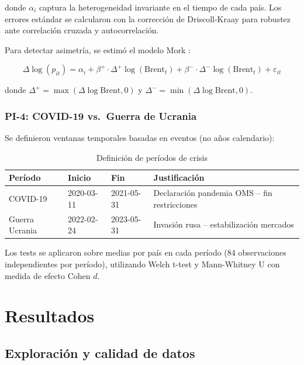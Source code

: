 \documentclass[stu, 12pt, a4paper, biblatex, donotrepeattitle]{apa7}
\begin{document}
donde $\alpha_i$ captura la heterogeneidad invariante en el tiempo de cada país. Los errores estándar se calcularon con la corrección de Driscoll-Kraay \parencite{driscollkraay1998} para robustez ante correlación cruzada y autocorrelación.

Para detectar asimetría, se estimó el modelo Mork \parencite{mork1989}:

\begin{equation}
\Delta\log(p_{it}) = \alpha_i + \beta^+ \cdot \Delta^+\log(\text{Brent}_t) + \beta^- \cdot \Delta^-\log(\text{Brent}_t) + \varepsilon_{it}
\end{equation}

donde $\Delta^+ = \max(\Delta\log\text{Brent}, 0)$ y $\Delta^- = \min(\Delta\log\text{Brent}, 0)$.

\subsubsection{PI-4: COVID-19 vs.\ Guerra de Ucrania}

Se definieron ventanas temporales basadas en eventos (no años calendario):

\begin{table}[H]
\centering
\caption{Definición de períodos de crisis}
\label{tab:periodos}
\begin{tabular}{llll}
\toprule
\textbf{Período} & \textbf{Inicio} & \textbf{Fin} & \textbf{Justificación} \\
\midrule
COVID-19 & 2020-03-11 & 2021-05-31 & Declaración pandemia OMS -- fin restricciones \\
Guerra Ucrania & 2022-02-24 & 2023-05-31 & Invasión rusa -- estabilización mercados \\
\bottomrule
\end{tabular}
\end{table}

Los tests se aplicaron sobre medias por país en cada período (84 observaciones independientes por período), utilizando Welch t-test y Mann-Whitney U con medida de efecto Cohen $d$.

\section{Resultados}

\subsection{Exploración y calidad de datos}
\end{document}

